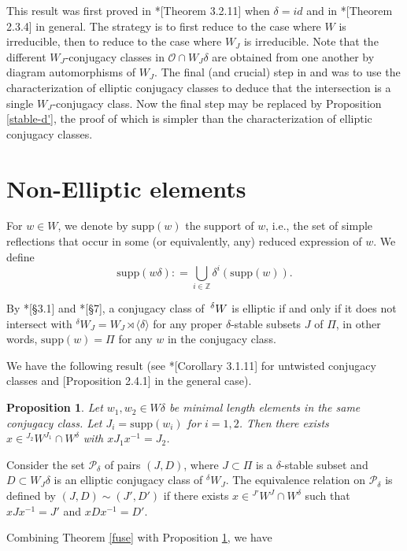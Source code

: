 \documentclass[10pt,leqno]{article}
\newtheorem{proposition}[equation]{Proposition}
\renewcommand{\sec}[1]{\section{#1}
\renewcommand{\theequation}{\thesection.\arabic{equation}}
  \setcounter{equation}{0}}
\newcommand{\Wext}{\negthinspace\negthinspace\phantom{a}^\delta W}
\def\d{\delta}
\renewcommand{\sec}[1]{\section{#1}
\renewcommand{\theequation}{\thesection.\arabic{equation}}
  \setcounter{equation}{0}}
\begin{document}
This result was first proved in \cite{geck_pfeiffer}*[Theorem 3.2.11] when $\d=id$ and in
\cite{CH}*[Theorem 2.3.4] in general. The strategy is to first reduce to the case where $W$ is irreducible, then to reduce to the case where $W_J$ is irreducible. Note that the different $W_J$-conjugacy classes in $\mathcal O \cap W_J \d$ are obtained from one another by diagram automorphisms of $W_J$. The final (and crucial) step in \cite{geck_pfeiffer} and \cite{CH} was to use the characterization of elliptic conjugacy classes to deduce that the intersection is a single $W_J$-conjugacy class. Now the final step may be replaced by Proposition \ref{stable-d'}, the proof of which is simpler than the characterization of elliptic conjugacy classes. 

\sec{Non-Elliptic elements}
\label{s:nonelliptic}

For $w \in W$, we denote by $\text{supp}(w)$ the support of $w$, i.e., the set of simple reflections that occur in some (or equivalently, any) reduced expression of $w$. We define $$\text{supp}(w\delta): =\bigcup_{i \in \mathbb Z} \delta^i(\text{supp}(w)).$$ 

By \cite{geck_pfeiffer}*[\S 3.1] and
\cite{he_minimal_length_double_cosets}*[\S 7], a conjugacy class of $\Wext$ is
elliptic if and only if it does not intersect with
${}^\delta W_J=W_J \rtimes \langle \delta \rangle$ for any proper
$\delta$-stable subsets $J$ of $\Pi$, in other words,
$\text{supp}(w)=\Pi$ for any $w$ in the conjugacy class.

We have the following result (see \cite{geck_pfeiffer}*[Corollary
3.1.11] for untwisted conjugacy classes and \cite{CH}[Proposition
2.4.1] in the general case).

\begin{proposition}\label{x-delta}
	Let $w_1, w_2 \in W\delta$ be minimal length elements in the same conjugacy class. Let $J_i=\text{supp}(w_i)$ for $i=1,2$. Then there exists $x \in {}^{J_2} W^{J_1} \cap W^\delta$ with $x J_1 x^{-1}=J_2$. 
\end{proposition}

Consider the set $\mathcal P_{\delta}$ of pairs $(J, D)$, where $J \subset \Pi$ is a $\delta$-stable subset and $D \subset W_J \delta$ is an elliptic conjugacy class of ${}^\delta W_J$. The equivalence relation on $\mathcal P_{\delta}$ is defined by $(J, D) \sim (J', D')$ if there exists $x \in {}^{J'} W^J \cap W^\delta$ such that $x J x^{-1}=J'$ and $x D x^{-1}=D'$. 

Combining Theorem \ref{fuse} with Proposition \ref{x-delta}, we have 
\end{document}

